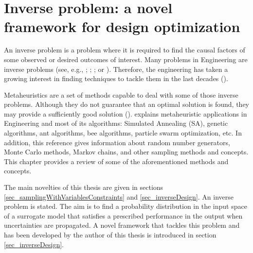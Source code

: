 \chapter[Inverse problem]{Inverse problem: a novel framework for design optimization} \label{chapter_inverseProblem} 

An inverse problem is a problem where it is required to find the causal factors of some observed or desired outcomes of interest. 
Many problems in Engineering are inverse problems (see, e.g., \textcite{tanaka1998}; \textcite{dulikravich2000}; \textcite{dulikravich2001}; or \textcite{tanaka2003}). 
Therefore, the engineering has taken a growing interest in finding techniques to tackle them in the last decades (\textcite{neto2012}).

Metaheuristics are a set of methods capable to deal with some of those inverse problems.
Although they do not guarantee that an optimal solution is found, they may provide a sufficiently good solution (\textcite{blum2001}).
\textcite{yang2010} explains metaheuristic applications in Engineering and most of its algorithms: Simulated Annealing (SA), genetic algorithms, ant algorithms, bee algorithms, particle swarm optimization, etc. In addition, this reference gives information about random number generators, Monte Carlo methods, Markov chains, and other sampling methods and concepts.
This chapter provides a review of some of the aforementioned methods and concepts.

The main novelties of this thesis are given in sections \ref{sec_samplingWithVariablesConstraints} and \ref{sec_inverseDesign}.
An inverse problem is stated. 
The aim is to find a probability distribution in the input space of a surrogate model that satisfies a prescribed performance in the output when uncertainties are propagated.
A novel framework that tackles this problem and has been developed by the author of this thesis is introduced in section \ref{sec_inverseDesign}.

